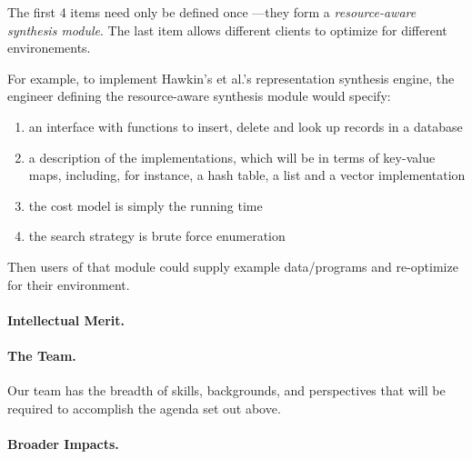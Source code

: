 The first 4 items need only be defined once ---they form a
\emph{resource-aware synthesis module}.  The last item allows
different clients to optimize for different environements.

For example, to implement Hawkin's et al.'s representation synthesis engine, the
engineer defining the resource-aware synthesis module would
specify:

\begin{enumerate}
\item an interface with functions to insert, delete and look up records in a database
\item a description of the implementations, which will be in terms of key-value maps,
including, for instance, a hash table, a list and a vector implementation
\item the cost model is simply the running time
\item the search strategy is brute force enumeration
\end{enumerate}

Then users of that module could supply example data/programs and re-optimize for
their environment.









\paragraph*{Intellectual Merit.}


\paragraph{The Team.}  Our team has the breadth of skills, backgrounds, and perspectives that will be required to accomplish the agenda set out above.  

\paragraph{Broader Impacts.}  

